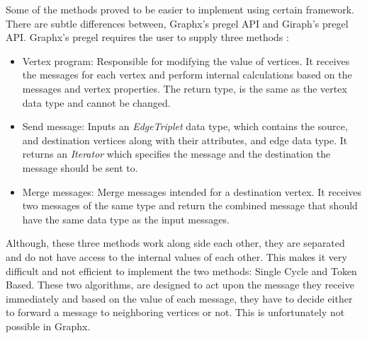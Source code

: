 \documentclass[english]{tktltiki}
\begin{document}
Some of the methods proved to be easier to implement using certain framework. 
There are subtle differences between, Graphx's pregel API and Giraph's pregel API. 
Graphx's pregel requires the user to supply three methods : 
\begin{itemize}
\item Vertex program: Responsible for modifying the value of vertices. 
It receives the messages for each vertex and perform internal calculations based on the messages and vertex properties. 
The return type, is the same as the vertex data type and cannot be changed.
\item Send message: Inputs an \textit{EdgeTriplet} data type, which contains the source, and destination vertices along with their attributes, and edge data type. 
It returns an \textit{Iterator} which specifies the message and the destination the message should be sent to.
\item Merge messages: Merge messages intended for a destination vertex. 
It receives two messages of the same type and return the combined message that should have the same data type as the input messages.
\end{itemize}

Although, these three methods work along side each other, they are separated and do not have access to the internal values of each other. This makes it very difficult and not efficient to implement the two methods: Single Cycle and Token Based. 
These two algorithms, are designed to act upon the message they receive immediately and based on the value of each message, they have to decide either to forward a message to neighboring vertices or not. 
This is unfortunately not possible in Graphx.
\end{document}
